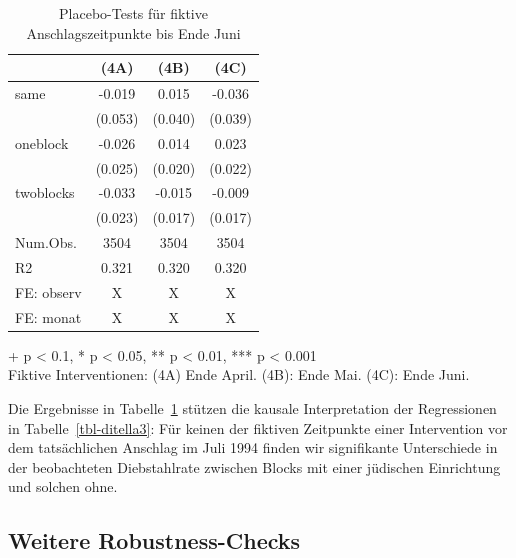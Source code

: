 \documentclass[
  a4paper,
  DIV=11,
  oneside]{scrreprt}
\begin{document}
\setlength{\LTpost}{0mm}

\begin{longtable}{lccc}

\caption{\label{tbl-placebopp}Placebo-Tests für fiktive
Anschlagszeitpunkte bis Ende Juni}

\tabularnewline

\toprule
  & (4A) & (4B) & (4C) \\ 
\midrule\addlinespace[2.5pt]
same & -0.019 & 0.015 & -0.036 \\ 
 & (0.053) & (0.040) & (0.039) \\ 
oneblock & -0.026 & 0.014 & 0.023 \\ 
 & (0.025) & (0.020) & (0.022) \\ 
twoblocks & -0.033 & -0.015 & -0.009 \\ 
 & (0.023) & (0.017) & (0.017) \\ 
Num.Obs. & 3504 & 3504 & 3504 \\ 
R2 & 0.321 & 0.320 & 0.320 \\ 
FE: observ & X & X & X \\ 
FE: monat & X & X & X \\ 
\bottomrule

\end{longtable}

\begin{minipage}{\linewidth}
+ p < 0.1, * p < 0.05, ** p < 0.01, *** p < 0.001\\
Fiktive Interventionen: (4A) Ende April. (4B): Ende Mai. (4C): Ende Juni.\\
\end{minipage}

Die Ergebnisse in Tabelle~\ref{tbl-placebopp} stützen die kausale
Interpretation der Regressionen in Tabelle~\ref{tbl-ditella3}: Für
keinen der fiktiven Zeitpunkte einer Intervention vor dem tatsächlichen
Anschlag im Juli 1994 finden wir signifikante Unterschiede in der
beobachteten Diebstahlrate zwischen Blocks mit einer jüdischen
Einrichtung und solchen ohne.

\subsection{Weitere Robustness-Checks}\label{weitere-robustness-checks}
\end{document}
